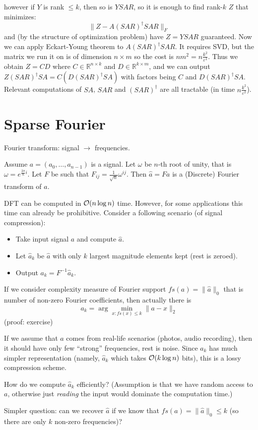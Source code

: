 \documentclass[11pt]{article}
\begin{document}
however if $Y$ is rank $\le k$, then so is $YSAR$, so it is enough to find rank-$k$ $Z$ that minimizes:
$$\|Z - A (SAR)^\dagger SAR\|_F$$
and (by the structure of optimization problem) have $Z = YSAR$ guaranteed. Now we can apply Eckart-Young theorem to $A(SAR)^\dagger SAR$. It requires SVD, but the matrix we run it on is of dimension $n \times m$ so the cost is $n m^2 = n \frac{k^2}{\varepsilon^2}$. Thus we obtain $Z = C D$ where $C \in \mathbb{R}^{n \times k}$ and $D \in \mathbb{R}^{k\times m}$, and we can output
$Z(SAR)^\dagger SA = C (D (SAR)^\dagger SA)$ with factors being $C$ and $D (SAR)^\dagger SA$. Relevant computations of $SA$, $SAR$ and $ (SAR)^\dagger $ are all tractable (in time $n \frac{k^2}{\varepsilon^2}$).



\section{Sparse Fourier}
Fourier transform: signal $\to$ frequencies. 
\begin{definition}
Assume $a = (a_0,\ldots,a_{n-1})$ is a signal. Let $\omega$ be $n$-th root of unity, that is $\omega = e^{\frac{2 \pi}{n}i}$. Let $F$ be such that $F_{ij} = \frac{1}{\sqrt{n}}\omega^{ij}$. Then $\hat{a} = F a$ is a (Discrete) Fourier transform of $a$.
\end{definition}

DFT can be computed in $\mathcal{O}(n \log n)$ time. However, for some applications this time can already be prohibitive. Consider a following scenario (of signal compression):
\begin{itemize}
\item Take input signal $a$ and compute $\hat{a}$.
\item Let $\hat{a}_k$ be $\hat{a}$ with only $k$ largest magnitude elements kept (rest is zeroed).
\item Output $a_k = F^{-1} \hat{a}_k$.
\end{itemize}

If we consider complexity measure of Fourier support $fs(a) = \|\hat{a}\|_0$ that is number of non-zero Fourier coefficients, then actually there is
$$ a_k = \arg \min_{x : fs(x) \le k} \|a - x\|_2$$
(proof: exercise)

If we assume that $a$ comes from real-life scenarios (photos, audio recording), then it should have only few ``strong'' frequencies, rest is noise. Since $a_k$ has much simpler representation (namely, $\hat{a}_k$ which takes $\mathcal{O}(k \log n)$ bits), this is a lossy compression scheme.

How do we compute $\hat{a}_k$ efficiently? (Assumption is that we have random access to $a$, otherwise just \emph{reading} the input would dominate the computation time.)

Simpler question: can we recover $\hat{a}$ if we know that $fs(a) = \|\hat{a}\|_0 \le k$ (so there are only $k$ non-zero frequencies)?



\end{document}
